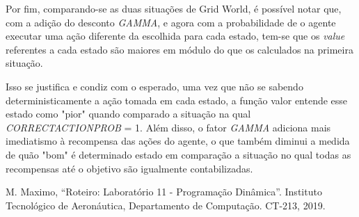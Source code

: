 \documentclass[conference]{IEEEtran}
\begin{document}
Por fim, comparando-se as duas situações de Grid World, é possível notar que, com a adição do desconto \textit{GAMMA}, e agora com a probabilidade de o agente executar uma ação diferente da escolhida para cada estado, tem-se que os \textit{value} referentes a cada estado são maiores em módulo do que os calculados na primeira situação.

Isso se justifica e condiz com o esperado, uma vez que não se sabendo deterministicamente a ação tomada em cada estado, a função valor entende esse estado como "pior" quando comparado a situação na qual \textit{CORRECT\underline{\space}ACTION\underline{\space}PROB} = 1. Além disso, o fator \textit{GAMMA} adiciona mais imediatismo à recompensa das ações do agente, o que também diminui a medida de quão "bom" é determinado estado em comparação a situação no qual todas as recompensas até o objetivo são igualmente contabilizadas.

\begin{thebibliography}{00}
 M. Maximo, ``Roteiro: Laboratório 11 - Programação Dinâmica''. Instituto Tecnológico de Aeronáutica, Departamento de Computação. CT-213, 2019.
\end{thebibliography}
\end{document}
